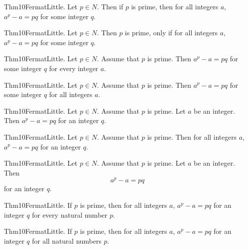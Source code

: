 \documentclass{article}
\begin{document}
Thm10FermatLittle. Let $p \in N$. Then if $p$ is prime, then for all integers $a$, $a ^ {p}- a = p q$ for some integer $q$.

Thm10FermatLittle. Let $p \in N$. Then $p$ is prime, only if for all integers $a$, $a ^ {p}- a = p q$ for some integer $q$.

Thm10FermatLittle. Let $p \in N$. Assume that $p$ is prime. Then $a ^ {p}- a = p q$ for some integer $q$ for every integer $a$.

Thm10FermatLittle. Let $p \in N$. Assume that $p$ is prime. Then $a ^ {p}- a = p q$ for some integer $q$ for all integers $a$.

Thm10FermatLittle. Let $p \in N$. Assume that $p$ is prime. Let $a$ be an integer. Then $a ^ {p}- a = p q$ for an integer $q$.

Thm10FermatLittle. Let $p \in N$. Assume that $p$ is prime. Then for all integers $a$, $a ^ {p}- a = p q$ for an integer $q$.

Thm10FermatLittle. Let $p \in N$. Assume that $p$ is prime. Let $a$ be an integer. Then $$a ^ {p}- a = p q$$ for an integer $q$.

Thm10FermatLittle. If $p$ is prime, then for all integers $a$, $a ^ {p}- a = p q$ for an integer $q$ for every natural number $p$.

Thm10FermatLittle. If $p$ is prime, then for all integers $a$, $a ^ {p}- a = p q$ for an integer $q$ for all natural numbers $p$.
\end{document}
